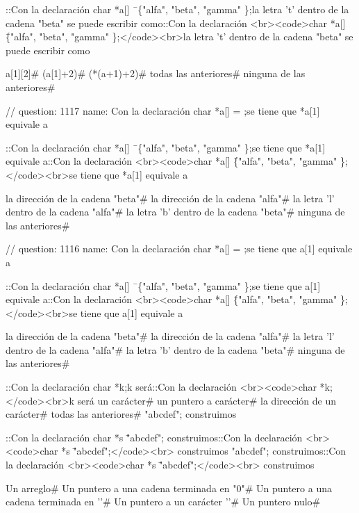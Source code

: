 \question ::Con la declaración char *a[] \= \
\correctchoice \{"alfa", "beta", "gamma" \};la letra 't' dentro de la cadena "beta" se puede escribir como::Con la declaración <br><code>char *a[] \= \{"alfa", "beta", "gamma" \};</code><br>la letra 't' dentro de la cadena "beta" se puede escribir como{
\choice a[1][2]# 
\choice *(a[1]+2)# 
\choice *(*(a+1)+2)# 
\correctchoice todas las anteriores# 
\choice ninguna de las anteriores# 

\question // question: 1117  name: Con la declaración char *a[] = 
\correctchoice {"alfa", "beta", "gamma" };se tiene que *a[1] equivale a 

\question ::Con la declaración char *a[] \= \
\correctchoice \{"alfa", "beta", "gamma" \};se tiene que *a[1] equivale a::Con la declaración <br><code>char *a[] \= \{"alfa", "beta", "gamma" \};</code><br>se tiene que *a[1] equivale a{
\choice la dirección de la cadena "beta"# 
\choice la dirección de la cadena "alfa"# 
\choice la letra 'l' dentro de la cadena "alfa"# 
\correctchoice la letra 'b' dentro de la cadena "beta"# 
\choice ninguna de las anteriores# 

\question // question: 1116  name: Con la declaración char *a[] = 
;se tiene que a[1] equivale a 

\question ::Con la declaración char *a[] \= \
\correctchoice \{"alfa", "beta", "gamma" \};se tiene que a[1] equivale a::Con la declaración <br><code>char *a[] \= \{"alfa", "beta", "gamma" \};</code><br>se tiene que a[1] equivale a{
\correctchoice la dirección de la cadena "beta"# 
\choice la dirección de la cadena "alfa"# 
\choice la letra 'l' dentro de la cadena "alfa"# 
\choice la letra 'b' dentro de la cadena "beta"# 
\choice ninguna de las anteriores# 

\question ::Con la declaración char *k;k será::Con la declaración <br><code>char *k;</code><br>k será
\choice un carácter# 
\correctchoice un puntero a carácter# 
\choice la dirección de un carácter# 
\choice todas las anteriores# 
\correctchoice "abcdef"; construimos 

\question ::Con la declaración char *s \= "abcdef"; construimos::Con la declaración <br><code>char *s \= "abcdef";</code><br> construimos
\correctchoice "abcdef"; construimos::Con la declaración <br><code>char *s \= "abcdef";</code><br> construimos{
\choice Un arreglo# 
\choice Un puntero a una cadena terminada en "0"# 
\correctchoice Un puntero a una cadena terminada en '\0'# 
\choice Un puntero a un carácter '\0'# 
\choice Un puntero nulo# 

}}}}
